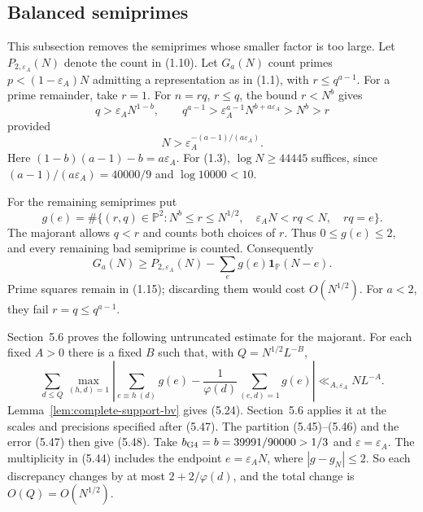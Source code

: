 \subsection{Balanced semiprimes}
This subsection removes the semiprimes whose smaller factor is too large.
Let $P_{2,\varepsilon_A}(N)$ denote the count in (1.10).
Let $G_a(N)$ count primes $p<(1-\varepsilon_A)N$ admitting a representation as in (1.1), with $r\le q^{a-1}$.
For a prime remainder, take $r=1$.
For $n=rq$, $r\le q$, the bound $r<N^b$ gives
\[
 q>\varepsilon_A N^{1-b},\qquad
 q^{a-1}>\varepsilon_A^{a-1}N^{b+a\varepsilon_A}>N^b>r       \tag{1.13}
\]
provided
\[
 N>\varepsilon_A^{-(a-1)/(a\varepsilon_A)}.                \tag{1.14}
\]
Here $(1-b)(a-1)-b=a\varepsilon_A$.
For (1.3), $\log N\ge44445$ suffices, since
$(a-1)/(a\varepsilon_A)=40000/9$ and $\log10000<10$.

For the remaining semiprimes put
\[
 g(e)=\#\{(r,q)\in\mathbb P^2:
       N^b\le r\le N^{1/2},\quad
       \varepsilon_A N<rq<N,\quad rq=e\}.                  \tag{1.15}
\]
The majorant allows $q<r$ and counts both choices of $r$.
Thus $0\le g(e)\le2$, and every remaining bad semiprime is counted.
Consequently
\[
 G_a(N)\ge P_{2,\varepsilon_A}(N)
                 -\sum_e g(e)\mathbf1_{\mathbb P}(N-e).     \tag{1.16}
\]
Prime squares remain in (1.15);
discarding them would cost $O(N^{1/2})$.
For $a<2$, they fail $r=q\le q^{a-1}$.

Section~5.6 proves the following untruncated estimate for the majorant.
For each fixed $A>0$ there is a fixed $B$ such that, with $Q=N^{1/2}L^{-B}$,
\[
 \sum_{d\le Q}\max_{(h,d)=1}
 \left|\sum_{e\equiv h\ (d)}g(e)
       -\frac1{\varphi(d)}\sum_{(e,d)=1}g(e)\right|
       \ll_{A,\varepsilon_A} NL^{-A}.                       \tag{1.17}
\]
Lemma~\ref{lem:complete-support-bv} gives (5.24).
Section~5.6 applies it at the scales and precisions specified after (5.47).
The partition (5.45)--(5.46) and the error (5.47) then give (5.48).
Take $b_{\rm G4}=b=39991/90000>1/3$ and $\varepsilon=\varepsilon_A$.
The multiplicity in (5.44) includes the endpoint $e=\varepsilon_AN$,
where $|g-g_N|\le2$.
So each discrepancy changes by at most $2+2/\varphi(d)$,
and the total change is $O(Q)=O(N^{1/2})$.

